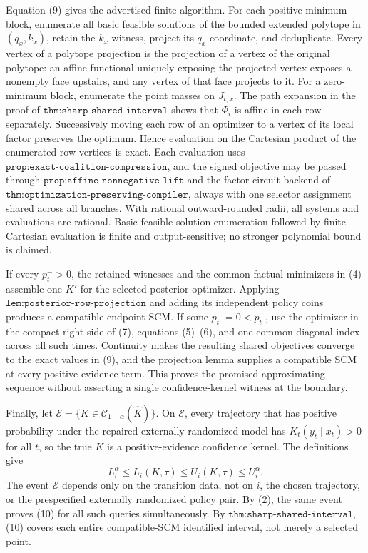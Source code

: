 Equation (9) gives the advertised finite algorithm.  For each positive-minimum block, enumerate all basic feasible solutions of the bounded extended polytope in \((q_x,k_x)\), retain the \(k_x\)-witness, project its \(q_x\)-coordinate, and deduplicate.  Every vertex of a polytope projection is the projection of a vertex of the original polytope: an affine functional uniquely exposing the projected vertex exposes a nonempty face upstairs, and any vertex of that face projects to it.  For a zero-minimum block, enumerate the point masses on \(J_{t,x}\).  The path expansion in the proof of \(\texttt{thm:sharp-shared-interval}\) shows that \(\Phi_i\) is affine in each row separately.  Successively moving each row of an optimizer to a vertex of its local factor preserves the optimum.  Hence evaluation on the Cartesian product of the enumerated row vertices is exact.  Each evaluation uses \(\texttt{prop:exact-coalition-compression}\), and the signed objective may be passed through \(\texttt{prop:affine-nonnegative-lift}\) and the factor-circuit backend of \(\texttt{thm:optimization-preserving-compiler}\), always with one selector assignment shared across all branches.  With rational outward-rounded radii, all systems and evaluations are rational.  Basic-feasible-solution enumeration followed by finite Cartesian evaluation is finite and output-sensitive; no stronger polynomial bound is claimed.

If every \(p_t^->0\), the retained witnesses and the common factual minimizers in (4) assemble one \(K'\) for the selected posterior optimizer.  Applying \(\texttt{lem:posterior-row-projection}\) and adding its independent policy coins produces a compatible endpoint SCM.  If some \(p_t^-=0<p_t^+\), use the optimizer in the compact right side of (7), equations (5)--(6), and one common diagonal index across all such times.  Continuity makes the resulting shared objectives converge to the exact values in (9), and the projection lemma supplies a compatible SCM at every positive-evidence term.  This proves the promised approximating sequence without asserting a single confidence-kernel witness at the boundary.

Finally, let \(\mathcal E=\{K\in\mathcal C_{1-\alpha}(\widehat K)\}\).  On \(\mathcal E\), every trajectory that has positive probability under the repaired externally randomized model has \(K_t(y_t\mid x_t)>0\) for all \(t\), so the true \(K\) is a positive-evidence confidence kernel.  The definitions give
\[
 L_i^\alpha\le L_i(K,\tau)\le U_i(K,\tau)\le U_i^\alpha. \tag{10}
\]
The event \(\mathcal E\) depends only on the transition data, not on \(i\), the chosen trajectory, or the prespecified externally randomized policy pair.  By (2), the same event proves (10) for all such queries simultaneously.  By \(\texttt{thm:sharp-shared-interval}\), (10) covers each entire compatible-SCM identified interval, not merely a selected point.
